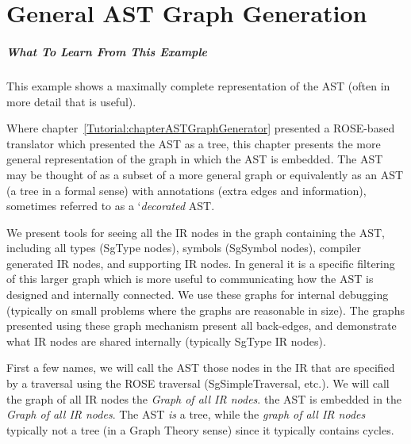 \chapter{General AST Graph Generation}
\label{Tutorial:chapterGeneralASTGraphGeneration}

\paragraph{What To Learn From This Example}
This example shows a maximally complete representation of the AST 
(often in more detail that is useful).

Where chapter~\ref{Tutorial:chapterASTGraphGenerator}
presented a ROSE-based translator which presented the AST as a tree, this chapter
presents the more general representation of the graph in which the AST is embedded.
The AST may be thought of as a subset of a more general graph or equivalently as
an AST (a tree in a formal sense) with annotations (extra edges and information),
sometimes referred to as a `{\em decorated} AST.

We present tools for seeing all the IR nodes in the graph containing the AST, including all types 
(SgType nodes), symbols (SgSymbol nodes), compiler generated IR nodes, and 
supporting IR nodes. In general
it is a specific filtering of this larger graph which is more useful to communicating
how the AST is designed and internally connected.  We use these graphs for internal 
debugging (typically on small problems where the graphs are reasonable in size).
The graphs presented using these graph mechanism present all back-edges, and
demonstrate what IR nodes are shared internally (typically SgType IR nodes).

First a few names, we will call the AST those nodes in the IR that are 
specified by a traversal using the ROSE traversal (SgSimpleTraversal, etc.).
We will call the graph of all IR nodes the {\em Graph of all IR nodes}.
the AST is embedded in the {\em Graph of all IR nodes}.  The AST {\em is} a tree,
while the {\em graph of all IR nodes} typically not a tree (in a Graph Theory sense)
since it typically contains cycles.

